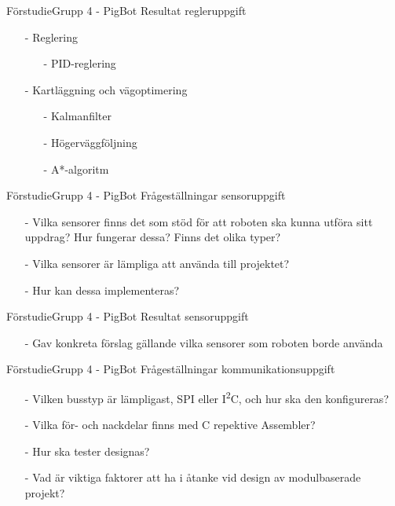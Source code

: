 
\begin{frame}{Förstudie}{Grupp 4 - PigBot}
Resultat regleruppgift
\pause
  \begin{itemize}
    \item[-] Reglering
\begin{itemize}
	\item [-] PID-reglering
\end{itemize}

    \item[-] Kartläggning och vägoptimering
\begin{itemize}
	\item [-] Kalmanfilter
	\item [-] Högerväggföljning
	\item [-] A*-algoritm
\end{itemize}
  \end{itemize}
\end{frame}


\begin{frame}{Förstudie}{Grupp 4 - PigBot}
Frågeställningar sensoruppgift
\pause
\begin{itemize}
    \item[-] Vilka sensorer finns det som stöd för att roboten ska kunna utföra sitt uppdrag? Hur fungerar dessa? Finns det olika typer?
    \item[-] Vilka sensorer är lämpliga att använda till projektet?
    \item[-] Hur kan dessa implementeras?
\end{itemize}
\end{frame}


\begin{frame}{Förstudie}{Grupp 4 - PigBot}
Resultat sensoruppgift
  \begin{itemize}
\pause
    \item[-] Gav konkreta förslag gällande vilka sensorer som roboten borde använda 
  \end{itemize}
\end{frame}

\begin{frame}{Förstudie}{Grupp 4 - PigBot}
Frågeställningar kommunikationsuppgift
\pause
\begin{itemize}
	\item[-] Vilken busstyp är lämpligast, SPI eller I\textsuperscript{2}C, och hur ska den konfigureras?
	\item[-] Vilka för- och nackdelar finns med C repektive Assembler? 
	\item[-] Hur ska tester designas?
	\item[-] Vad är viktiga faktorer att ha i åtanke vid design av modulbaserade projekt?
\end{itemize}
\end{frame}

